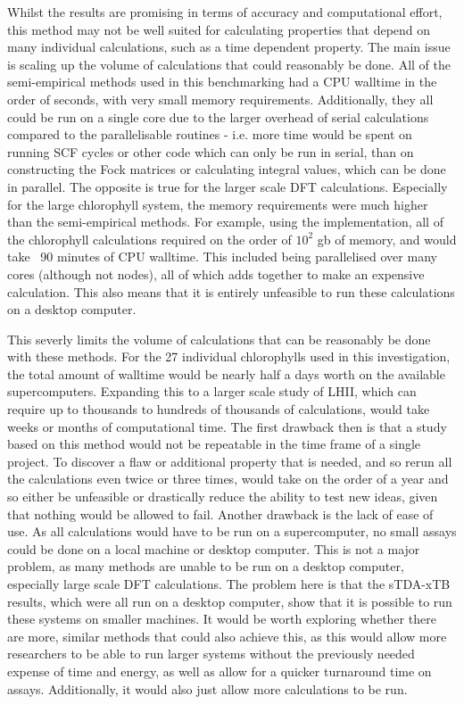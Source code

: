 Whilst the \dscf results are promising in terms of accuracy and computational 
effort, this method may not be well suited for calculating properties that depend
on many individual calculations, such as a time dependent property. The main issue
is scaling up the volume of calculations that could reasonably be done.
All of the semi-empirical methods used in this benchmarking had a CPU walltime 
in the order of seconds, with very small memory requirements. Additionally, they
all could be run on a single core due to the larger overhead of serial calculations
compared to the parallelisable routines - i.e. more time would be spent on running
SCF cycles or other code which can only be run in serial, than on
constructing the Fock matrices or calculating integral values, which can be done in
parallel.
The opposite is true for the larger scale DFT calculations. Especially for the large
chlorophyll system, the memory requirements were much higher than the semi-empirical
methods. For example, using the  implementation, all of the chlorophyll 
calculations required on the order of $10^2$ gb of memory, and would take ~90 minutes
of CPU walltime. This included being parallelised over many cores (although not
nodes), all of which adds together to make an expensive calculation. This
also means that it is entirely unfeasible to run these calculations on a desktop
computer.

This severly limits the volume of calculations that can be reasonably be done with
these methods. For the 27 individual chlorophylls used in this investigation,
the total amount of walltime would be nearly half a days worth on the
available supercomputers. Expanding this to a larger scale study of LHII, which
can require up to thousands to hundreds of thousands of calculations,
would take weeks or months of computational time. The first drawback then is that
a study based on this method would not be repeatable in the time frame of a single project.
To discover a flaw or additional property that is needed, and so rerun all the
calculations even twice or three times, would take on the order of a year and so
either be unfeasible or drastically reduce the ability to test new ideas, given 
that nothing would be allowed to fail. Another drawback is the lack of ease of
use. As all calculations would have to be run on a supercomputer, no small assays
could be done on a local machine or desktop computer. This is not a major problem,
as many methods are unable to be run on a desktop computer, especially large scale
DFT calculations. The problem here is that the sTDA-xTB results, which were all 
run on a desktop computer, show that it is possible to run these systems on smaller
machines. It would be worth exploring whether there are more, similar methods that
could also achieve this, as this would allow more researchers to be able to run 
larger systems without the previously needed expense of time and energy, as well
as allow for a quicker turnaround time on assays. Additionally, it would also just
allow more calculations to be run.

